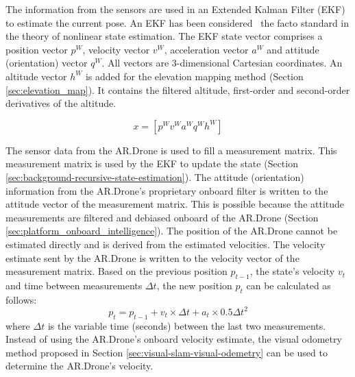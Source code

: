 The information from the sensors are used in an Extended Kalman Filter (EKF) to estimate the current pose.
An EKF has been considered~\cite{julier2004unscented} the facto standard in the theory of nonlinear state estimation.
The EKF state vector comprises a position vector $p^{W}$, velocity vector $v^{W}$, acceleration vector $a^{W}$ and attitude (orientation) vector $q^{W}$.
All vectors are 3-dimensional Cartesian coordinates.
An altitude vector $h^W$ is added for the elevation mapping method (Section \ref{sec:elevation_map}). It contains the filtered altitude, first-order and second-order derivatives of the altitude.

\begin{equation}
x = [ p^{W}  v^{W}  a^{W}  q^{W} h^{W} ]
\label{eq:EKF_state_vecor}
\end{equation}

The sensor data from the AR.Drone is used to fill a measurement matrix.
This measurement matrix is used by the EKF to update the state (Section \ref{sec:background-recursive-state-estimation}).
The attitude (orientation) information from the AR.Drone's proprietary onboard filter is written to the attitude vector of the measurement matrix.
This is possible because the attitude measurements are filtered and debiased onboard of the AR.Drone (Section \ref{sec:platform_onboard_intelligence}).
The position of the AR.Drone cannot be estimated directly and is derived from the estimated velocities.
The velocity estimate sent by the AR.Drone is written to the velocity vector of the measurement matrix.
Based on the previous position $p_{t-1}$, the state's velocity $v_{t}$ and time between measurements $\Delta t$, the new position $p_{t}$ can be calculated as follows:
\begin{equation}
p_{t} = p_{t-1} + v_{t} \times \Delta t + a_{t} \times 0.5 \Delta t^2
\end{equation}
where $\Delta t$ is the variable time (seconds) between the last two measurements.
Instead of using the AR.Drone's onboard velocity estimate, the visual odometry method proposed in Section \ref{sec:visual-slam-visual-odemetry} can be used to determine the AR.Drone's velocity.

